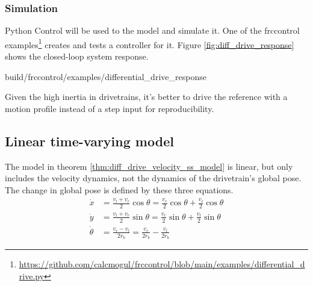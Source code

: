 \subsubsection{Simulation}

Python Control will be used to  the
\gls{model} and simulate it. One of the frccontrol
examples\footnote{\url{https://github.com/calcmogul/frccontrol/blob/main/examples/differential_drive.py}}
creates and tests a controller for it. Figure \ref{fig:diff_drive_response}
shows the closed-loop \gls{system} response.
\begin{svg}{build/frccontrol/examples/differential_drive_response}
  \caption{Drivetrain response}
  \label{fig:diff_drive_response}
\end{svg}

Given the high inertia in drivetrains, it's better to drive the \gls{reference}
with a motion profile instead of a \gls{step input} for reproducibility.

\subsection{Linear time-varying model}

The model in theorem \ref{thm:diff_drive_velocity_ss_model} is linear, but only
includes the velocity dynamics, not the dynamics of the drivetrain's global
pose. The change in global pose is defined by these three equations.
\begin{align*}
  \dot{x} &= \frac{v_l + v_r}{2}\cos\theta = \frac{v_r}{2}\cos\theta +
    \frac{v_l}{2}\cos\theta \\
  \dot{y} &= \frac{v_l + v_r}{2}\sin\theta = \frac{v_r}{2}\sin\theta +
    \frac{v_l}{2}\sin\theta \\
  \dot{\theta} &= \frac{v_r - v_l}{2r_b} = \frac{v_r}{2r_b} - \frac{v_l}{2r_b}
\end{align*}

